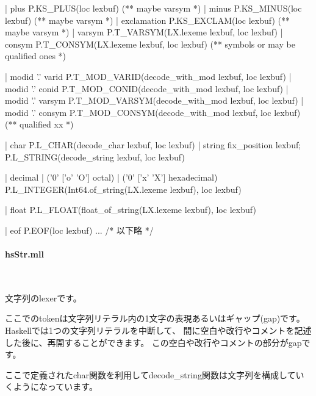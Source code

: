 \documentclass[mingoth,a4paper]{jsarticle}
\begin{document}
\begin{commandline}
  | plus       { P.KS_PLUS(loc lexbuf) }  (** maybe varsym *)
  | minus      { P.KS_MINUS(loc lexbuf) } (** maybe varsym *)
  | exclamation  { P.KS_EXCLAM(loc lexbuf) } (** maybe varsym *)
  | varsym     { P.T_VARSYM(LX.lexeme lexbuf, loc lexbuf) }
  | consym     { P.T_CONSYM(LX.lexeme lexbuf, loc lexbuf) }
      (** symbols or may be qualified ones *)

  | modid '.' varid   { P.T_MOD_VARID(decode_with_mod lexbuf, loc lexbuf) }
  | modid '.' conid   { P.T_MOD_CONID(decode_with_mod lexbuf, loc lexbuf) }
  | modid '.' varsym  { P.T_MOD_VARSYM(decode_with_mod lexbuf, loc lexbuf) }
  | modid '.' consym  { P.T_MOD_CONSYM(decode_with_mod lexbuf, loc lexbuf) }
      (** qualified xx *)

  | char      { P.L_CHAR(decode_char lexbuf, loc lexbuf) }
  | string    { fix_position lexbuf; P.L_STRING(decode_string lexbuf, loc lexbuf) }

  | decimal | ('0' ['o' 'O'] octal) | ('0' ['x' 'X'] hexadecimal)
        { P.L_INTEGER(Int64.of_string(LX.lexeme lexbuf), loc lexbuf) }

  | float      { P.L_FLOAT(float_of_string(LX.lexeme lexbuf), loc lexbuf) }

  | eof        { P.EOF(loc lexbuf) }
  ... /* 以下略 */
\end{commandline}


\paragraph{hsStr.mll} \ 

文字列のlexerです。

ここでのtokenは文字列リテラル内の1文字の表現あるいはギャップ(gap)です。
Haskellでは1つの文字列リテラルを中断して、
間に空白や改行やコメントを記述した後に、再開することができます。
この空白や改行やコメントの部分がgapです。

ここで定義されたchar関数を利用してdecode\_string関数は文字列を構成していくようになっています。
\end{document}

